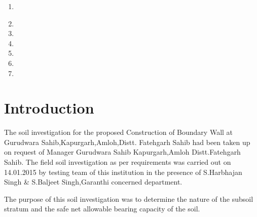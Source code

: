 \documentclass{soil1}
\begin{document}
\clearpage
\justify
{}
\begin{enumerate}
\item{
}
\item{}
\item{}
\item{}
\item{}
\item{}
\item{}
\end{enumerate}
\clearpage
\section{Introduction}
The soil investigation for the proposed Construction of Boundary Wall at Gurudwara Sahib,Kapurgarh,Amloh,Distt. Fatehgarh Sahib  had been taken up on request of Manager Gurudwara Sahib Kapurgarh,Amloh Distt.Fatehgarh Sahib. The field soil investigation as per requirements was
carried out on 14.01.2015 by testing team of this institution in the presence of S.Harbhajan Singh \& S.Baljeet Singh,Garanthi concerned department.\par
The purpose of this soil investigation was to determine the nature of the subsoil stratum and the safe net
allowable bearing capacity of the soil.
\end{document}
